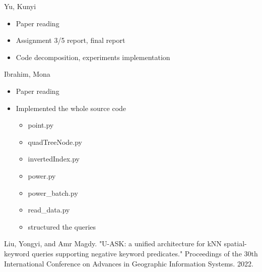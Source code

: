 \documentclass[]{IEEEphot}
\begin{document}
\item Yu, Kunyi
\begin{itemize}
    \item Paper reading
    \item Assignment 3/5 report, final report
    \item Code decomposition, experiments implementation
\end{itemize}
\item Ibrahim, Mona
\begin{itemize}
    \item Paper reading
    \item Implemented the whole source code
    	\begin{itemize}
		  \item point.py 
		  \item quadTreeNode.py
		  \item invertedIndex.py
		  \item power.py
		  \item power_batch.py
		  \item read_data.py
		  \item structured the queries
\end{itemize}
\end {itemize}

\begin{thebibliography}{10}
     Liu, Yongyi, and Amr Magdy. "U-ASK: a unified architecture for kNN spatial-keyword queries supporting negative keyword predicates." Proceedings of the 30th International Conference on Advances in Geographic Information Systems. 2022.
\end{thebibliography}
\end{document}
